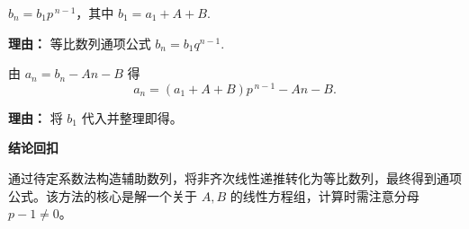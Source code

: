 \begin{proofbox}
\begin{description}[style=nextline, leftmargin=2.8em, labelsep=0.5em, itemsep=0.55em]
		\item[\textbf{步骤五（写出 $b_n$ 通项）：}]
			$b_n = b_1 p^{\,n-1}$，其中 $b_1 = a_1 + A + B$.
			\par\textbf{理由：} 等比数列通项公式 $b_n = b_1 q^{n-1}$.

		\item[\textbf{步骤六（回代求 $a_n$）：}]
			由 $a_n = b_n - A n - B$ 得
			\[
				a_n = (a_1 + A + B) p^{\,n-1} - A n - B.
			\]
			\par\textbf{理由：} 将 $b_1$ 代入并整理即得。
	\end{description}

	\medskip
	\textbf{\textcolor{CProof}{结论回扣}}

	通过待定系数法构造辅助数列，将非齐次线性递推转化为等比数列，最终得到通项公式。该方法的核心是解一个关于 $A,B$ 的线性方程组，计算时需注意分母 $p-1\neq0$。
\end{proofbox}
